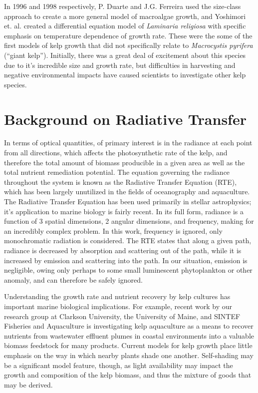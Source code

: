 In 1996 and 1998 respectively, P. Duarte and J.G. Ferreira used the size-class approach to create a more general model of macroalgae growth, and Yoshimori et. al. created a differential equation model of \textit{Laminaria religiosa} with specific emphasis on temperature dependence of growth rate\cite{duarte_model_1997,yoshimori_mathematical_1998}.
These were the some of the first models of kelp growth that did not specifically relate to \textit{Macrocystis pyrifera} (``giant kelp''). 
Initially, there was a great deal of excitement about this species due to it's incredible size and growth rate, but difficulties in harvesting and negative environmental impacts have caused scientists to investigate other kelp species. %

\section{Background on Radiative Transfer}
In terms of optical quantities, of primary interest is in the radiance at each point from all directions, which affects the photosynthetic rate of the kelp, and therefore the total amount of biomass producible in a given area as well as the total nutrient remediation potential.
The equation governing the radiance throughout the system is known as the Radiative Transfer Equation (RTE), which has been largely unutilized in the fields of oceanography and aquaculture.
The Radiative Transfer Equation has been used primarily in stellar astrophysics; it's application to marine biology is fairly recent\cite{mobley_radiative_2001}.
In its full form, radiance is a function of 3 spatial dimensions, 2 angular dimensions, and frequency, making for an incredibly complex problem. %
In this work, frequency is ignored, only monochromatic radiation is considered.
The RTE states that along a given path, radiance is decreased by absorption and scattering out of the path, while it is increased by emission and scattering into the path.
In our situation, emission is negligible, owing only perhaps to some small luminescent phytoplankton or other anomaly, and can therefore be safely ignored.

Understanding the growth rate and nutrient recovery by
kelp cultures has important marine biological implications. For example, recent
work by our research group at Clarkson University, the University of Maine, and
SINTEF Fisheries and Aquaculture is investigating kelp aquaculture as a means to
recover nutrients from wastewater effluent plumes in coastal environments into a
valuable biomass feedstock for many products. Current models for kelp growth
place little emphasis on the way in which nearby plants shade one another.
Self-shading may be a significant model feature, though, as light availability
may impact the growth and composition of the kelp biomass, and thus the mixture
of goods that may be derived.

